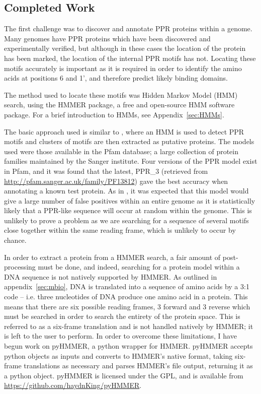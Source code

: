 \documentclass[twoside,a4paper]{article}
\begin{document}
\begin{multicols}{2}

\section{Completed Work}

The first challenge was to discover and annotate PPR proteins within a genome.
Many genomes have PPR proteins which have been discovered and experimentally
verified, but although in these cases the location of the protein has been
marked, the location of the internal PPR motifs has not.
Locating these motifs accurately is important as it is required in order to
identify the amino acids at positions 6 and 1', and therefore predict likely
binding domains.

The method used to locate these motifs was Hidden Markov Model (HMM) search, 
using the HMMER package, a free and open-source HMM software package.
For a brief introduction to HMMs, see Appendix~\ref{sec:HMMs}.

The basic approach used is similar to \cite{Lurin2004}, where an HMM is used to
detect PPR motifs and clusters of motifs are then extracted as putative
proteins.
The models used were those available in the Pfam database; a large collection
of protein families maintained by the Sanger institute.
Four versions of the PPR model exist in Pfam, and it was found that the latest,
PPR\_3 (retrieved from \url{http://pfam.sanger.ac.uk/family/PF13812}) gave the
best accuracy when annotating a known test protein.
As in \cite{Lurin2004}, it was expected that this model would give a large
number of false positives within an entire genome as it is statistically likely
that a PPR-like sequence will occur at random within the genome.
This is unlikely to prove a problem as we are searching for a sequence of
several motifs close together within the same reading frame, which is unlikely
to occur by chance.

In order to extract a protein from a HMMER search, a fair amount of
post-processing must be done, and indeed, searching for a protein model within
a DNA sequence is not natively supported by HMMER.
As outlined in appendix~\ref{sec:mbio}, DNA is translated into a sequence of
amino acids by a 3:1 code -- i.e. three nucleotides of DNA produce one amino
acid in a protein.
This means that there are six possible reading frames, 3 forward and 3 reverse
which must be searched in order to search the entirety of the protein space.
This is referred to as a six-frame translation and is not handled natively by
HMMER; it is left to the user to perform.
In order to overcome these limitations, I have begun work on pyHMMER, a python
wrapper for HMMER.
pyHMMER accepts python objects as inputs and converts to HMMER's
native format, taking six-frame translations as necessary and parses HMMER's
file output, returning it as a python object.
pyHMMER is licensed under the GPL, and is available from
\url{https://github.com/haydnKing/pyHMMER}.


\end{multicols}
\end{document}
